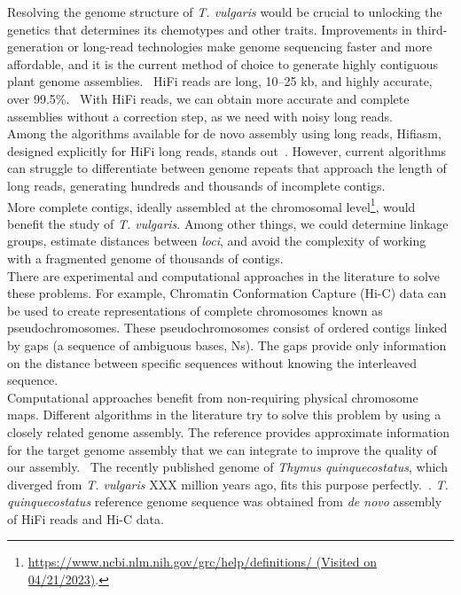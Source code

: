 Resolving the genome structure of \textit{T. vulgaris} would be crucial to unlocking the genetics that determines its chemotypes and other traits.  Improvements in third-generation or long-read technologies make genome sequencing faster and more affordable, and it is the current method of choice to generate highly contiguous plant genome assemblies.~\cite{puckerPlantGenomeSequence2022} \ac{HiFi} reads are long, 10–25 kb, and highly accurate, over 99.5\%.~\cite{honHighlyAccurateLongread2020} With \ac{HiFi} reads, we can obtain more accurate and complete assemblies without a correction step, as we need with noisy long reads.~\cite{puckerPlantGenomeSequence2022}\\

Among the algorithms available for de novo assembly using long reads, Hifiasm, designed explicitly for \ac{HiFi} long reads, stands out~\cite{chengHaplotyperesolvedNovoAssembly2021}. However, current algorithms can struggle to differentiate between genome repeats that approach the length of long reads, generating hundreds and thousands of incomplete contigs.~\cite{huangAlignGraph2SimilarGenomeassisted2021} \\

More complete contigs, ideally assembled at the chromosomal level\footnote{\url{https://www.ncbi.nlm.nih.gov/grc/help/definitions/ (Visited on 04/21/2023)}.}, would benefit the study of \textit{T. vulgaris}. Among other things, we could determine linkage groups, estimate distances between \textit{loci}, and avoid the complexity of working with a fragmented genome of thousands of contigs.~\cite{tamazianChromosomerReferencebasedGenome2016}\\

There are experimental and computational approaches in the literature to solve these problems. For example, Chromatin Conformation Capture (\ac{Hi-C}) data can be used to create representations of complete chromosomes known as pseudochromosomes. These pseudochromosomes consist of ordered contigs linked by gaps (a sequence of ambiguous bases, Ns). The gaps provide only information on the distance between specific sequences without knowing the interleaved sequence.~\cite{puckerPlantGenomeSequence2022}\\

Computational approaches benefit from non-requiring physical chromosome maps. Different algorithms in the literature try to solve this problem by using a closely related genome assembly. The reference provides approximate information for the target genome assembly that we can integrate to improve the quality of our assembly.~\cite{huangAlignGraph2SimilarGenomeassisted2021}  The recently published genome of \textit{Thymus quinquecostatus}, which diverged from \textit{T. vulgaris} XXX million years ago,  fits this purpose perfectly.~\cite{sunChromosomelevelAssemblyAnalysis2022}. \textit{T. quinquecostatus} reference genome sequence was obtained from \textit{de novo} assembly of  \ac{HiFi} reads and \ac{Hi-C} data.\\ 

